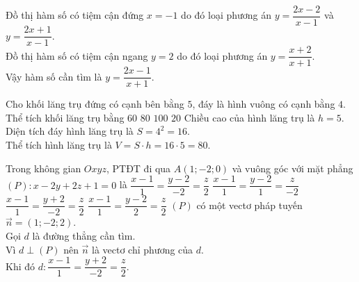 \begin{ex}%
\loigiai
{
Đồ thị hàm số có tiệm cận đứng $x=-1$ do đó loại phương án $y=\dfrac{2x-2}{x-1}$ và $y=\dfrac{2x+1}{x-1}$.\\
Đồ thị hàm số có tiệm cận ngang $y=2$ do đó loại phương án $y=\dfrac{x+2}{x+1}$.\\
Vậy hàm số cần tìm là $y=\dfrac{2x-1}{x+1}$.
}
\end{ex}

\begin{ex}%
Cho khối lăng trụ đứng có cạnh bên bằng $5$, đáy là hình vuông có cạnh bằng $4$. Thể tích khối lăng trụ bằng
\choice 
{$60$} 
{\True $80$}
{$100$} 
{$20$}
\loigiai
{
Chiều cao của hình lăng trụ là $h=5$.\\
Diện tích đáy hình lăng trụ là $S=4^2=16$.\\
Thể tích hình lăng trụ là $V=S\cdot h=16\cdot 5=80 $.
}
\end{ex}

\begin{ex}%
Trong không gian $Oxyz$, PTĐT đi qua $A(1;-2;0)$ và vuông góc với mặt phẳng $(P)\colon x-2y+2z+1=0$ là
\choice 
{$\dfrac{x-1}{1}=\dfrac{y-2}{-2}=\dfrac{z}{2}$} 
{$\dfrac{x-1}{1}=\dfrac{y-2}{1}=\dfrac{z}{-2}$}
{\True $\dfrac{x-1}{1}=\dfrac{y+2}{-2}=\dfrac{z}{2}$} 
{$\dfrac{x-1}{1}=\dfrac{y-2}{2}=\dfrac{z}{2}$}
\loigiai
{
$(P)$ có một vectơ pháp tuyến $\overrightarrow{n}=(1;-2;2)$.\\
Gọi $d$ là đường thẳng cần tìm.\\
Vì $d\perp (P)$ nên $\overrightarrow{n}$ là vectơ chỉ phương của $d$.\\
Khi đó $d\colon\dfrac{x-1}{1}=\dfrac{y+2}{-2}=\dfrac{z}{2}$.
}
\end{ex}

